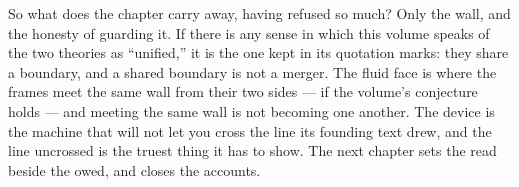 So what does the chapter carry away, having refused so much? Only the wall, and
the honesty of guarding it. If there is any sense in which this volume speaks of
the two theories as ``unified,'' it is the one kept in its quotation marks: they
share a boundary, and a shared boundary is not a merger. The fluid face is where
the frames meet the same wall from their two sides --- if the volume's conjecture
holds --- and meeting the same wall is not becoming one another. The device is
the machine that will not let you cross the line its founding text drew, and the
line uncrossed is the truest thing it has to show. The next chapter sets the read
beside the owed, and closes the accounts.
